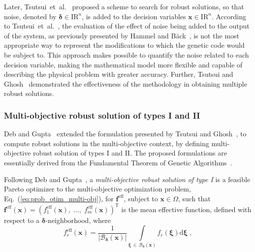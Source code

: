 \documentclass[final,5p,times,twocolumn,numbers]{elsarticle}
\newcommand{\vect}[1]{\mathbf{\boldsymbol{#1}}}
\begin{document}
Later, Tsutsui~et~al.~\cite{bib:tsutsui1996} proposed a scheme to search for robust solutions, so that noise, denoted by $ \vect{\delta} \in \mathrm{I\!R}^{n} $, is added to the decision variables $ \mathbf{x} \in \mathrm{I\!R}^{n} $. According to Tsutsui~et~al.~\cite{bib:tsutsui1996}, the evaluation of the effect of noise being added to the output of the system, as previously presented by Hammel and B{\"a}ck~\cite{bib:hammel1994}, is not the most appropriate way to represent the modifications to which the genetic code would be subject to. This approach makes possible to quantify the noise related to each decision variable, making the mathematical model more flexible and capable of describing the physical problem with greater accuracy. Further, Tsutsui and Ghosh~\cite{bib:tsutsui1997} demonstrated the effectiveness of the methodology in obtaining multiple robust solutions.

\subsubsection{Multi-objective robust solution of types I and II} \label{sec:tec_robustez}

Deb and Gupta~\cite{bib:deb2005} extended the formulation presented by Tsutsui and Ghosh~\cite{bib:tsutsui1997}, to compute robust solutions in the multi-objective context, by defining multi-objective robust solution of types I and II. The proposed formulations are essentially derived from the Fundamental Theorem of Genetic Algorithms~\cite{bib:goldberg1989}.

Following Deb and Gupta~\cite{bib:deb2005}, a \textit{multi-objective robust solution of type I} is a feasible Pareto optimizer to the multi-objective optimization problem, Eq.~(\ref{eq:prob_otim_multi-obj}), for $ \mathbf{f}^{\mathrm{eff}} $, subject to $ \mathbf{x} \in \Omega $, such that $ \mathbf{f}^{\mathrm{eff}} \left( \mathbf{x} \right) = \left( f_{1}^{\mathrm{eff}} \left( \mathbf{x} \right), \; \dots, \; f_{m}^{\mathrm{eff}} \left( \mathbf{x} \right) \right)^{\mathrm{T}} $ is the mean effective function, defined with respect to a $ \vect{\delta} $-neighborhood, where
%
\begin{equation} \label{eq:integral_media_efetiva}
f_{r}^{\mathrm{eff}} \left( \mathbf{x} \right) = \dfrac{1}{\vert \mathcal{B}_{\vect{\delta}} \left( \mathbf{x} \right) \vert} \int\limits_{\vect{\xi} \, \in \, \mathcal{B}_{\vect{\delta}} \left( \mathbf{x} \right)} f_{r} \left( \vect{\xi} \right) \mathrm{d} \vect{\xi} \; ,
\end{equation}
\end{document}
